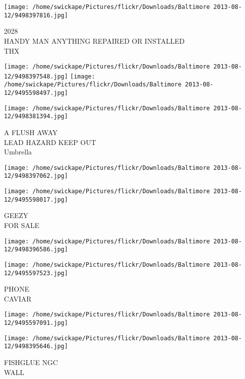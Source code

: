 \documentclass[10pt,letterpaper]{article}
\begin{document}
\vspace{0.25in}
\texttt{[image: /home/swickape/Pictures/flickr/Downloads/Baltimore 2013-08-12/9498397816.jpg]}

2028\\
HANDY MAN ANYTHING REPAIRED OR INSTALLED\\
THX\\
\pagebreak

\texttt{[image: /home/swickape/Pictures/flickr/Downloads/Baltimore 2013-08-12/9498397548.jpg]}
\texttt{[image: /home/swickape/Pictures/flickr/Downloads/Baltimore 2013-08-12/9495598497.jpg]}

\texttt{[image: /home/swickape/Pictures/flickr/Downloads/Baltimore 2013-08-12/9498381394.jpg]}

A FLUSH AWAY\\
LEAD HAZARD KEEP OUT\\
Umbrella\\
\pagebreak

\texttt{[image: /home/swickape/Pictures/flickr/Downloads/Baltimore 2013-08-12/9498397062.jpg]}

\vspace{0.25in}
\texttt{[image: /home/swickape/Pictures/flickr/Downloads/Baltimore 2013-08-12/9495598017.jpg]}

GEEZY\\
FOR SALE\\
\pagebreak

\texttt{[image: /home/swickape/Pictures/flickr/Downloads/Baltimore 2013-08-12/9498396586.jpg]}

\vspace{0.25in}
\texttt{[image: /home/swickape/Pictures/flickr/Downloads/Baltimore 2013-08-12/9495597523.jpg]}

PHONE\\
CAVIAR\\
\pagebreak

\texttt{[image: /home/swickape/Pictures/flickr/Downloads/Baltimore 2013-08-12/9495597091.jpg]}

\vspace{0.25in}
\texttt{[image: /home/swickape/Pictures/flickr/Downloads/Baltimore 2013-08-12/9498395646.jpg]}

FISHGLUE NGC\\
WALL\\
\pagebreak
\end{document}
